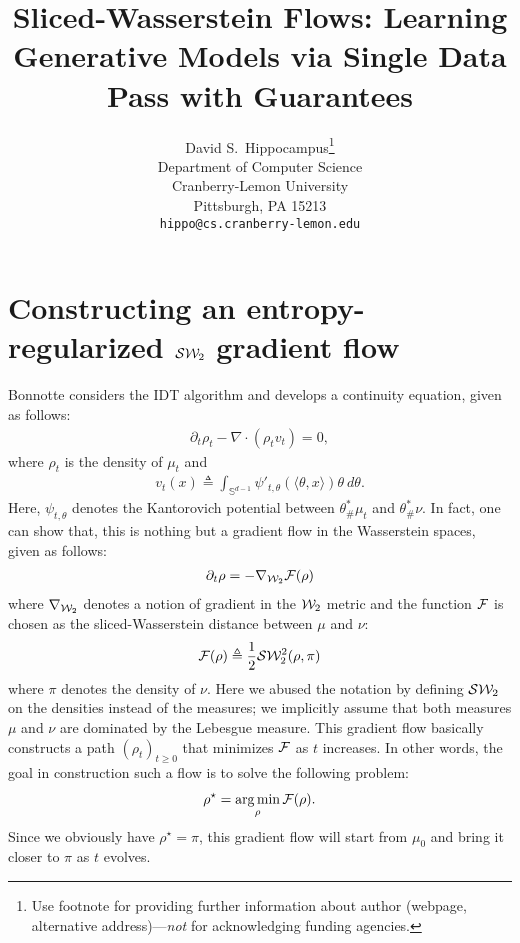 \documentclass{article}
\title{Sliced-Wasserstein Flows: Learning Generative Models via Single Data Pass with Guarantees}
\author{
  David S.~Hippocampus\thanks{Use footnote for providing further
    information about author (webpage, alternative
    address)---\emph{not} for acknowledging funding agencies.} \\
  Department of Computer Science\\
  Cranberry-Lemon University\\
  Pittsburgh, PA 15213 \\
  \texttt{hippo@cs.cranberry-lemon.edu} \\
}
\newcommand{\W}{{\cal W}_2}
\newcommand{\F}{{\cal F}}
\newcommand{\SW}{{\cal S}{\cal W}_2}
\DeclareMathOperator*{\argmin}{arg\min}
\begin{document}

\maketitle

\begin{abstract}
  
\end{abstract}

\section{Constructing an entropy-regularized $\SW$ gradient flow}

Bonnotte \cite{bonnotte2013unidimensional} considers the IDT algorithm \cite{pitie2005n} and develops a continuity equation, given as follows:
\begin{align}
\partial_t \rho_t - \nabla \cdot (\rho_t v_t) = 0,
\end{align}
where $\rho_t$ is the density of $\mu_t$ and 
\begin{align}
v_t(x) \triangleq \int_{\mathbb{S}^{d-1}} \psi'_{t,\theta}(\langle \theta, x \rangle) \theta \> d\theta. \label{eqn:idt_v}
\end{align}
Here, $\psi_{t,\theta}$ denotes the Kantorovich potential between $\theta^*_{\#}\mu_t$ and $\theta^*_{\#}\nu$. In fact, one can show that, this is nothing but a gradient flow in the Wasserstein spaces, given as follows:
\begin{align}
\partial_t \rho = - \nabla_{\W} \F(\rho) \label{eqn:gradflow}
\end{align}
where $\nabla_{\W}$ denotes a notion of gradient in the $\W$ metric and the function $\F$ is chosen as the sliced-Wasserstein distance between $\mu$ and $\nu$:
\begin{align}
\F(\rho) \triangleq \frac1{2} \SW^2(\rho, \pi)
\end{align}
where $\pi$ denotes the density of $\nu$. Here we abused the notation by defining $\SW$ on the densities instead of the measures; we implicitly assume that both measures $\mu$ and $\nu$ are dominated by the Lebesgue measure. This gradient flow basically constructs a path $(\rho_t)_{t\geq 0}$ that minimizes $\F$ as $t$ increases. In other words, the goal in construction such a flow is to solve the following problem:
\begin{align}
\rho^\star = \argmin_\rho \F(\rho).
\end{align}
Since we obviously have $\rho^\star = \pi$, this gradient flow will start from $\mu_0$ and bring it closer to $\pi$ as $t$ evolves.
\end{document}

